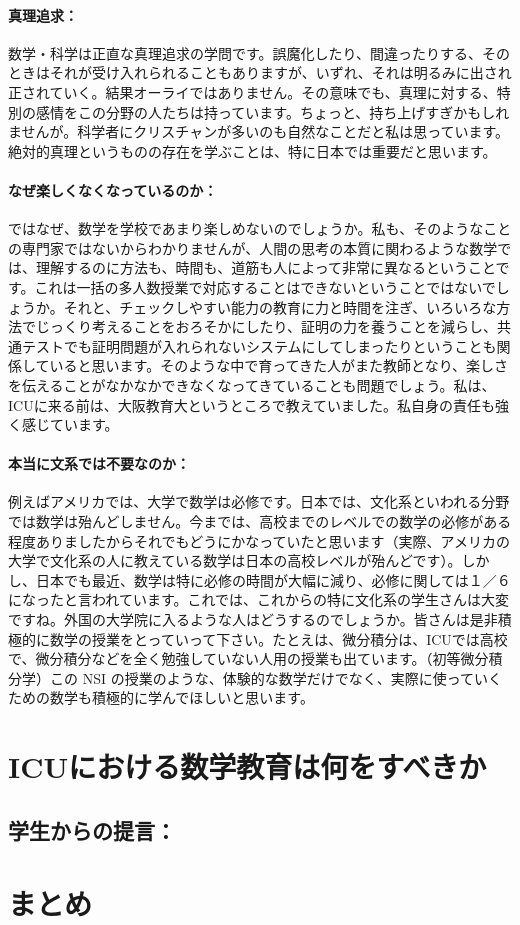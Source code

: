 \documentclass[12pt]{jarticle}
\begin{document}
\paragraph{真理追求：}

数学・科学は正直な真理追求の学問です。誤魔化したり、間違ったりする、そのときはそれが受け入れられることもありますが、いずれ、それは明るみに出され正されていく。結果オーライではありません。その意味でも、真理に対する、特別の感情をこの分野の人たちは持っています。ちょっと、持ち上げすぎかもしれませんが。科学者にクリスチャンが多いのも自然なことだと私は思っています。絶対的真理というものの存在を学ぶことは、特に日本では重要だと思います。

\paragraph{なぜ楽しくなくなっているのか：}

ではなぜ、数学を学校であまり楽しめないのでしょうか。私も、そのようなことの専門家ではないからわかりませんが、人間の思考の本質に関わるような数学では、理解するのに方法も、時間も、道筋も人によって非常に異なるということです。これは一括の多人数授業で対応することはできないということではないでしょうか。それと、チェックしやすい能力の教育に力と時間を注ぎ、いろいろな方法でじっくり考えることをおろそかにしたり、証明の力を養うことを減らし、共通テストでも証明問題が入れられないシステムにしてしまったりということも関係していると思います。そのような中で育ってきた人がまた教師となり、楽しさを伝えることがなかなかできなくなってきていることも問題でしょう。私は、ICUに来る前は、大阪教育大というところで教えていました。私自身の責任も強く感じています。
 
\paragraph{本当に文系では不要なのか：} 

例えばアメリカでは、大学で数学は必修です。日本では、文化系といわれる分野では数学は殆んどしません。今までは、高校までのレベルでの数学の必修がある程度ありましたからそれでもどうにかなっていたと思います（実際、アメリカの大学で文化系の人に教えている数学は日本の高校レベルが殆んどです）。しかし、日本でも最近、数学は特に必修の時間が大幅に減り、必修に関しては１／６になったと言われています。これでは、これからの特に文化系の学生さんは大変ですね。外国の大学院に入るような人はどうするのでしょうか。皆さんは是非積極的に数学の授業をとっていって下さい。たとえは、微分積分は、ICUでは高校で、微分積分などを全く勉強していない人用の授業も出ています。（初等微分積分学）この NSI の授業のような、体験的な数学だけでなく、実際に使っていくための数学も積極的に学んでほしいと思います。

\section{ICUにおける数学教育は何をすべきか}

\subsection{学生からの提言：}

\section{まとめ}
\end{document}
